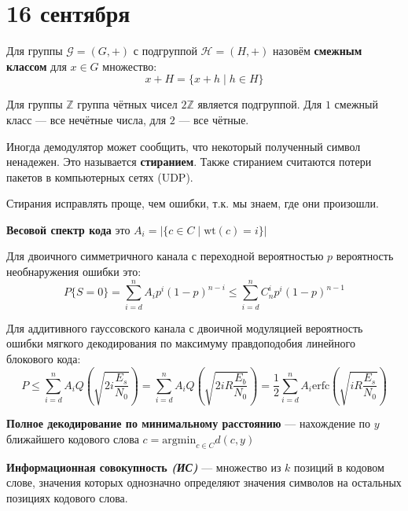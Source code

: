 \chapter{16 сентября}

\begin{definition}
    Для группы \(\mathcal{G} = (G, +)\) с подгруппой \(\mathcal{H} = (H, +)\) назовём \textbf{смежным классом} для \(x \in G\) множество:
    \[x + H = \{x + h \mid h \in H\}\]
\end{definition}

\begin{example}
    Для группы \(\mathbb{Z}\) группа чётных чисел \(2\mathbb{Z}\) является подгруппой. Для \(1\) смежный класс --- все нечётные числа, для \(2\) --- все чётные.
\end{example}

\unfinished

Иногда демодулятор может сообщить, что некоторый полученный символ ненадежен.
Это называется \textbf{стиранием}.
Также стиранием считаются потери пакетов в компьютерных сетях (UDP).

Стирания исправлять проще, чем ошибки, т.к. мы знаем, где они произошли.

\begin{definition}
    \textbf{Весовой спектр кода} это \(A_i = |\{c \in C \mid \mathrm{wt}(c) = i\}|\)
\end{definition}

Для двоичного симметричного канала с переходной вероятностью \(p\) вероятность необнаружения ошибки это:
\[P \{S = 0\} = \sum_{i=d}^{n} A_i p^i (1 - p)^{n - i} \leq \sum_{i=d}^{n} C_n^i p^i (1 - p)^{n - 1}\]
\unfinished

Для аддитивного гауссовского канала с двоичной модуляцией вероятность ошибки мягкого декодирования по максимуму правдоподобия линейного блокового кода:
\[P \leq \sum_{i=d}^{n} A_i Q \left(\sqrt{2i \frac{E_s}{N_0}}\right)
    = \sum_{i=d}^{n} A_i Q \left(\sqrt{2iR \frac{E_b}{N_0}}\right)
    = \frac{1}{2} \sum_{i=d}^{n} A_i \mathrm{erfc}\left(\sqrt{iR \frac{E_s}{N_0}}\right)\]

\begin{definition}
    \textbf{Полное декодирование по минимальному расстоянию} --- нахождение по \(y\) ближайшего кодового слова \(c = \mathrm{argmin}_{c \in C} d(c, y)\)
\end{definition}

\begin{definition}
    \textbf{Информационная совокупность \textit{(ИС)}} --- множество из \(k\) позиций в кодовом слове,
    значения которых однозначно определяют значения символов на остальных позициях кодового слова.
\end{definition}

